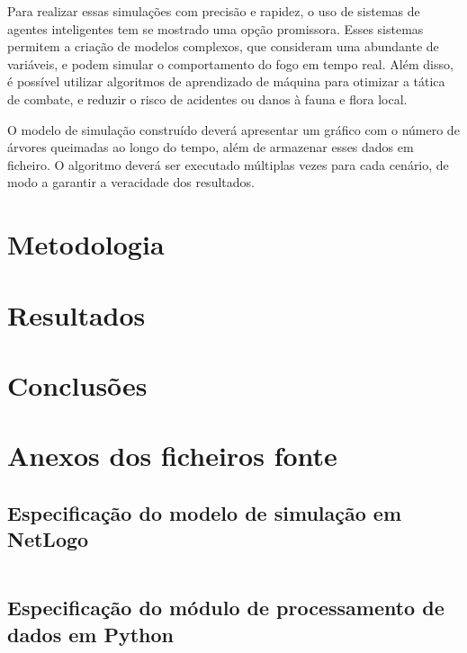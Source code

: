 \documentclass[a4paper, portuguese]{report}
\begin{document}
    Para realizar essas simulações com precisão e rapidez, o uso de sistemas de agentes inteligentes tem se mostrado uma opção promissora.
    Esses sistemas permitem a criação de modelos complexos, que consideram uma abundante de variáveis, e podem simular o comportamento do fogo em tempo real.
    Além disso, é possível utilizar algoritmos de aprendizado de máquina para otimizar a tática de combate, e reduzir o risco de acidentes ou danos à fauna e flora local.

    O modelo de simulação construído deverá apresentar um gráfico com o número de árvores queimadas ao longo do tempo, além de armazenar esses dados em ficheiro.
    O algoritmo deverá ser executado múltiplas vezes para cada cenário, de modo a garantir a veracidade dos resultados.


    \chapter{Metodologia}\label{ch:methodology}
    


    \chapter{Resultados}\label{ch:results}
    


    \chapter{Conclusões}\label{ch:conclusoes}
    

    \appendix


    \chapter{Anexos dos ficheiros fonte}\label{ch:appendix}


    \section{Especificação do modelo de simulação em NetLogo}\label{sec:model_spec}
    \inputminted{nl-lexer.py:NetLogoLexer -x}{../src/forest_fire.nlogo}


    \section{Especificação do módulo de processamento de dados em Python}\label{sec:data_proc}
\end{document}
